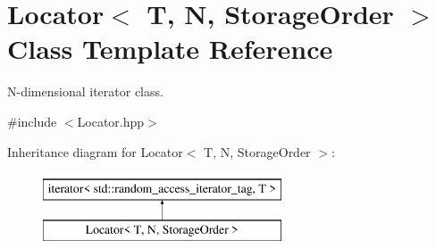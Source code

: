 \hypertarget{class_d_o_1_1_locator}{\section{Locator$<$ T, N, Storage\-Order $>$ Class Template Reference}
\label{class_d_o_1_1_locator}
}


N-\/dimensional iterator class.  




{\ttfamily \#include $<$Locator.\-hpp$>$}

Inheritance diagram for Locator$<$ T, N, Storage\-Order $>$\-:\begin{figure}[H]
\begin{center}
\leavevmode
\includegraphics[height=2.000000cm]{class_d_o_1_1_locator}
\end{center}
\end{figure}
